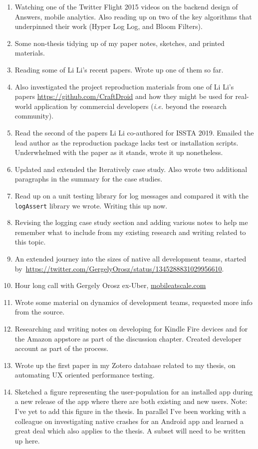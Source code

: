 \begin{enumerate}
    \item Watching one of the Twitter Flight 2015 videos on the backend design of Answers, mobile analytics. Also reading up on two of the key algorithms that underpinned their work (Hyper Log Log, and Bloom Filters).
    \item Some non-thesis tidying up of my paper notes, sketches, and printed materials.
    \item Reading some of Li Li's recent papers. Wrote up one of them so far.
    \item Also investigated the project reproduction materials from one of Li Li's papers \url{https://github.com/CraftDroid} and how they might be used for real-world application by commercial developers (\textit{i.e.} beyond the research community).
    \item Read the second of the papers Li Li co-authored for ISSTA 2019. Emailed the lead author as the reproduction package lacks test or installation scripts. Underwhelmed with the paper as it stands, wrote it up nonetheless.
    \item Updated and extended the Iteratively case study. Also wrote two additional paragraphs in the summary for the case studies.
    \item Read up on a unit testing library for log messages and compared it with the \texttt{logAssert} library we wrote. Writing this up now.
    \item Revising the logging case study section and adding various notes to help me remember what to include from my existing research and writing related to this topic.
    \item An extended journey into the sizes of native all development teams, started by~\url{https://twitter.com/GergelyOrosz/status/1345288831029956610}.
    \item Hour long call with Gergely Orosz ex-Uber, \href{https://www.mobileatscale.com/}{mobileatscale.com}
    \item Wrote some material on dynamics of development teams, requested more info from the source.
    \item Researching and writing notes on developing for Kindle Fire devices and for the Amazon appstore as part of the discussion chapter. Created developer account as part of the process.
    \item Wrote up the first paper in my Zotero database related to my thesis, on automating UX oriented performance testing.
    \item Sketched a figure representing the user-population for an installed app during a new release of the app where there are both existing and new users. Note: I've yet to add this figure in the thesis. In parallel I've been working with a colleague on investigating native crashes for an Android app and learned a great deal which also applies to the thesis. A subset will need to be written up here.

\end{enumerate}
